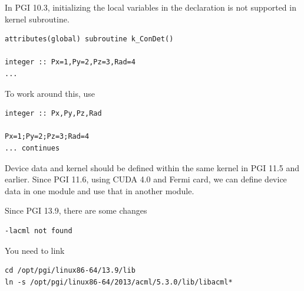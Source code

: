 In PGI 10.3, initializing the local variables in the declaration is
not supported in kernel subroutine. 
\begin{lstlisting}
attributes(global) subroutine k_ConDet()

integer :: Px=1,Py=2,Pz=3,Rad=4 
...
\end{lstlisting}

To work around this, use
\begin{lstlisting}
integer :: Px,Py,Pz,Rad

Px=1;Py=2;Pz=3;Rad=4
... continues 
\end{lstlisting}

Device data and kernel should be defined within the same kernel in PGI 11.5 and
earlier. Since PGI 11.6, using CUDA 4.0 and Fermi card, we can define device
data in one module and use that in another module. 

Since PGI 13.9, there are some changes
\begin{verbatim}
-lacml not found
\end{verbatim}
You need to link
\begin{verbatim}
cd /opt/pgi/linux86-64/13.9/lib
ln -s /opt/pgi/linux86-64/2013/acml/5.3.0/lib/libacml* 
\end{verbatim} 


